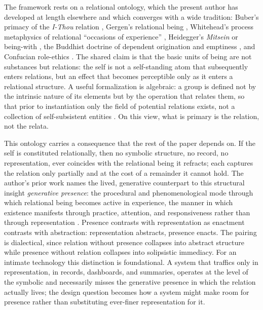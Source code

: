 \documentclass[11pt,a4paper]{article}
\begin{document}
The framework rests on a relational ontology, which the present author has developed at length elsewhere \parencite{huang2025relational} and which converges with a wide tradition: Buber's primacy of the \emph{I-Thou} relation \parencite{buber1937iandthou}, Gergen's relational being \parencite{gergen2009relational}, Whitehead's process metaphysics of relational ``occasions of experience'' \parencite{whitehead1978process}, Heidegger's \emph{Mitsein} or being-with \parencite{heidegger1962being}, the Buddhist doctrine of dependent origination and emptiness \parencite{nagarjuna1995mulamadhyamakakarika}, and Confucian role-ethics \parencite{ames2011confucian}. The shared claim is that the basic units of being are not substances but relations: the self is not a self-standing atom that subsequently enters relations, but an effect that becomes perceptible only as it enters a relational structure. A useful formalization is algebraic: a group is defined not by the intrinsic nature of its elements but by the operation that relates them, so that prior to instantiation only the field of potential relations exists, not a collection of self-subsistent entities \parencite{huang2025relational}. On this view, what is primary is the relation, not the relata.

This ontology carries a consequence that the rest of the paper depends on. If the self is constituted relationally, then no symbolic structure, no record, no representation, ever coincides with the relational being it refracts; each captures the relation only partially and at the cost of a remainder it cannot hold. The author's prior work names the lived, generative counterpart to this structural insight \emph{generative presence}: the procedural and phenomenological mode through which relational being becomes active in experience, the manner in which existence manifests through practice, attention, and responsiveness rather than through representation \parencite{huang2025relational}. Presence contrasts with representation as enactment contrasts with abstraction: representation abstracts, presence enacts. The pairing is dialectical, since relation without presence collapses into abstract structure while presence without relation collapses into solipsistic immediacy. For an intimate technology this distinction is foundational. A system that traffics only in representation, in records, dashboards, and summaries, operates at the level of the symbolic and necessarily misses the generative presence in which the relation actually lives; the design question becomes how a system might make room for presence rather than substituting ever-finer representation for it.
\end{document}
